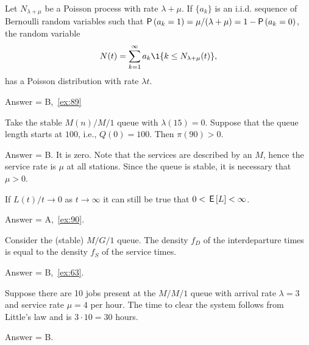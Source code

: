 \begin{exercise}[201907]
  Let $N_{\lambda+\mu}$ be a Poisson process with rate $\lambda+\mu$. If $\{a_k\}$ is an i.i.d. sequence of Bernoulli random variables such that $\P{a_k=1} = \mu/(\lambda+\mu)=1-\P{a_k=0}$,  the random variable
  \begin{equation*}
    N(t) = \sum_{k=1}^\infty a_k \1{k \leq N_{\lambda+\mu}(t)},
  \end{equation*}
has a Poisson distribution with rate $\lambda t$. 
\begin{solution}
Answer = B,~\cref{ex:89}
\end{solution}
\end{exercise}

\begin{exercise}[201907]
Take the stable $M(n)/M/1$ queue with $\lambda(15) =0$. Suppose that the queue length starts at $100$, i.e., $Q(0) = 100$. Then $\pi(90) > 0$. 
\begin{solution}
Answer = B. It is zero. Note that the services are described by an $M$, hence the service rate is $\mu$ at all stations. Since the queue is stable, it is necessary that $\mu>0$. 
\end{solution}
\end{exercise}

\begin{exercise}[201907]
  If $L(t)/t \to 0$ as $t\to\infty$ it can still be true that  $0<\,\mathsf{E}\left[L\right]<\infty$.
\begin{solution}
Answer = A,~\cref{ex:90}.
\end{solution}
\end{exercise}

\begin{exercise}[201907]
  Consider the (stable) $M/G/1$ queue. The density $f_D$ of the interdeparture times is equal to the density $f_S$ of the service times. 
\begin{solution}
Answer = B,~\cref{ex:63}.
\end{solution}
\end{exercise}

\begin{exercise}[201907]
  Suppose there are 10 jobs present at the $M/M/1$ queue with arrival rate $\lambda=3$ and service rate $\mu=4$ per hour.
  The time to clear the system follows from Little's law and is $3\cdot 10 = 30$ hours.
\begin{solution}
Answer = B.
\end{solution}
\end{exercise}

